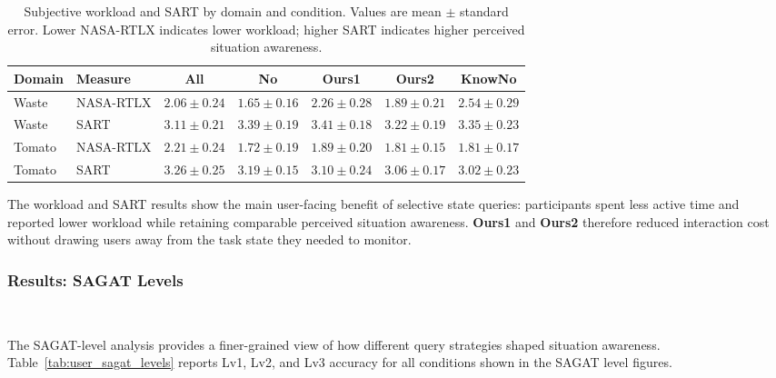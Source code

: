 \begin{table}[t]
\centering
\caption{Subjective workload and SART by domain and condition. Values are mean $\pm$ standard error. Lower NASA-RTLX indicates lower workload; higher SART indicates higher perceived situation awareness.}
\label{tab:user_workload_sa}
\small
\setlength{\tabcolsep}{4pt}
\begin{tabular*}{\textwidth}{@{\extracolsep{\fill}}llccccc}
\toprule
\textbf{Domain} & \textbf{Measure} & \textbf{All} & \textbf{No} & \textbf{Ours1} & \textbf{Ours2} & \textbf{KnowNo} \\
\midrule
Waste & NASA-RTLX & $2.06 \pm 0.24$ & $1.65 \pm 0.16$ & $2.26 \pm 0.28$ & $1.89 \pm 0.21$ & $2.54 \pm 0.29$ \\
Waste & SART & $3.11 \pm 0.21$ & $3.39 \pm 0.19$ & $3.41 \pm 0.18$ & $3.22 \pm 0.19$ & $3.35 \pm 0.23$ \\
Tomato & NASA-RTLX & $2.21 \pm 0.24$ & $1.72 \pm 0.19$ & $1.89 \pm 0.20$ & $1.81 \pm 0.15$ & $1.81 \pm 0.17$ \\
Tomato & SART & $3.26 \pm 0.25$ & $3.19 \pm 0.15$ & $3.10 \pm 0.24$ & $3.06 \pm 0.17$ & $3.02 \pm 0.23$ \\
\bottomrule
\end{tabular*}
\end{table}

The workload and SART results show the main user-facing benefit of selective state queries: participants spent less active time and reported lower workload while retaining comparable perceived situation awareness. \textbf{Ours1} and \textbf{Ours2} therefore reduced interaction cost without drawing users away from the task state they needed to monitor.

\subsubsection{Results: SAGAT Levels}~\label{user:results_sagat_levels}

The SAGAT-level analysis provides a finer-grained view of how different query strategies shaped situation awareness. Table~\ref{tab:user_sagat_levels} reports Lv1, Lv2, and Lv3 accuracy for all conditions shown in the SAGAT level figures.

